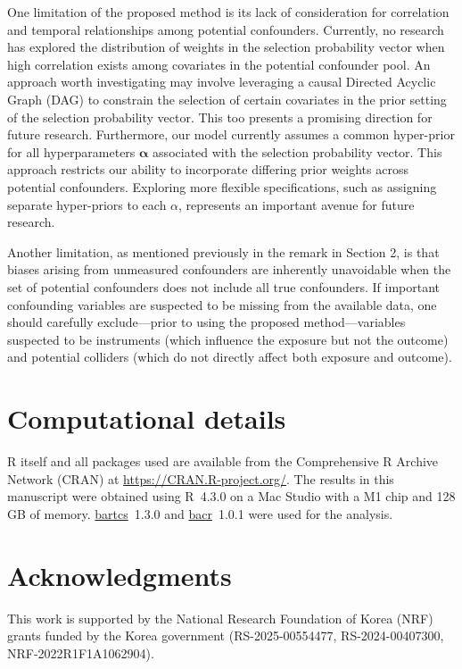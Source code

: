 One limitation of the proposed method is its lack of consideration for correlation and temporal relationships among potential confounders. Currently, no research has explored the distribution of weights in the selection probability vector when high correlation exists among covariates in the potential confounder pool. An approach worth investigating may involve leveraging a causal Directed Acyclic Graph (DAG) to constrain the selection of certain covariates in the prior setting of the selection probability vector. This too presents a promising direction for future research. Furthermore, our model currently assumes a common hyper-prior for all hyperparameters $\boldsymbol{\alpha}$ associated with the selection probability vector. This approach restricts our ability to incorporate differing prior weights across potential confounders. Exploring more flexible specifications, such as assigning separate hyper-priors to each $\alpha$, represents an important avenue for future research.

Another limitation, as mentioned previously in the remark in Section 2, is that biases arising from unmeasured confounders are inherently unavoidable when the set of potential confounders does not include all true confounders. If important confounding variables are suspected to be missing from the available data, one should carefully exclude—prior to using the proposed method—variables suspected to be instruments (which influence the exposure but not the outcome) and potential colliders (which do not directly affect both exposure and outcome).



\section*{Computational details}

R itself and all packages used are available from the Comprehensive
R Archive Network (CRAN) at \url{https://CRAN.R-project.org/}. The results in this manuscript were obtained using R~4.3.0 on a Mac Studio with
a M1 chip and 128 GB of memory. \href{https://cran.r-project.org/package=bartcs}{bartcs}~1.3.0 and \href{https://cran.r-project.org/package=bacr}{bacr}~1.0.1 were used for the analysis.


\section*{Acknowledgments}
This work is supported by the National Research Foundation of Korea (NRF) grants funded by the Korea government (RS-2025-00554477, RS-2024-00407300, NRF-2022R1F1A1062904).



